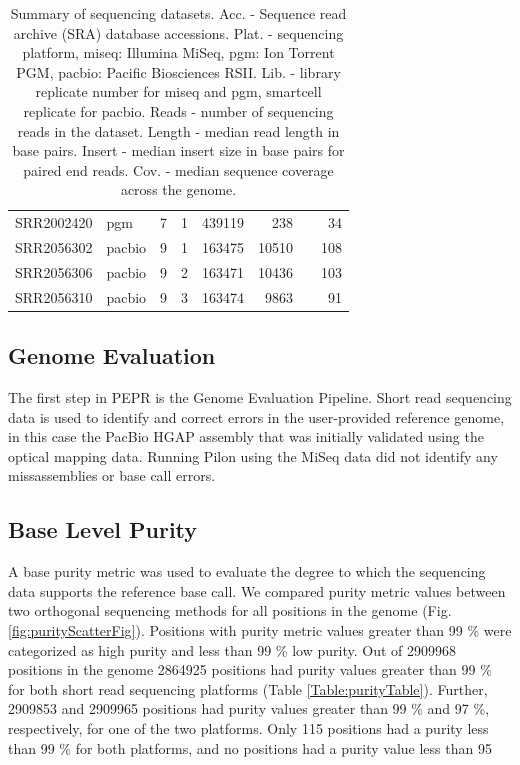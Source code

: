 \documentclass[smallextended]{svjour3}\usepackage[]{graphicx}\usepackage[]{color}
\begin{document}
\begin{table}[ht]
\begin{tabular}{llrrrrrr}
  SRR2002420 & pgm & 7 & 1 & 439119 & 238 &  & 34 \\ 
  SRR2056302 & pacbio & 9 & 1 & 163475 & 10510 &  & 108 \\ 
  SRR2056306 & pacbio & 9 & 2 & 163471 & 10436 &  & 103 \\ 
  SRR2056310 & pacbio & 9 & 3 & 163474 & 9863 &  & 91 \\ 
   \hline
\end{tabular}
\caption{Summary of sequencing datasets.  Acc. - Sequence read archive (SRA) database accessions. Plat. - sequencing platform, miseq: Illumina MiSeq, pgm: Ion Torrent PGM, pacbio: Pacific Biosciences RSII. Lib. - library replicate number for miseq and pgm, smartcell replicate for pacbio. Reads - number of sequencing reads in the dataset. Length - median read length in base pairs.  Insert - median insert size in base pairs for paired end reads.  Cov. - median sequence coverage across the genome.} 
\label{Table:seqTable}
\end{table}


\subsection{Genome Evaluation}
The first step in PEPR is the Genome Evaluation Pipeline.  Short read sequencing data is used to identify and correct errors in the user-provided reference genome, in this case the PacBio HGAP assembly that was initially validated using the optical mapping data. Running Pilon using the MiSeq data did not identify any missassemblies or base call errors. 


\subsection{Base Level Purity}


A base purity metric was used to evaluate the degree to which the sequencing data supports the reference base call.  We compared purity metric values between two orthogonal sequencing methods for all positions in the genome (Fig. \ref{fig:purityScatterFig}). Positions with purity metric values greater than 99 \% were categorized as high purity and less than 99 \% low purity. Out of 2909968 positions in the genome 2864925 positions had purity values greater than 99 \% for both short read sequencing platforms (Table \ref{Table:purityTable}).  Further, 2909853 and 2909965 positions had purity values greater than 99 \% and 97 \%, respectively, for one of the two platforms.  Only 115 positions had a purity less than 99 \% for both platforms, and no positions had a purity value less than 95%
\end{document}
